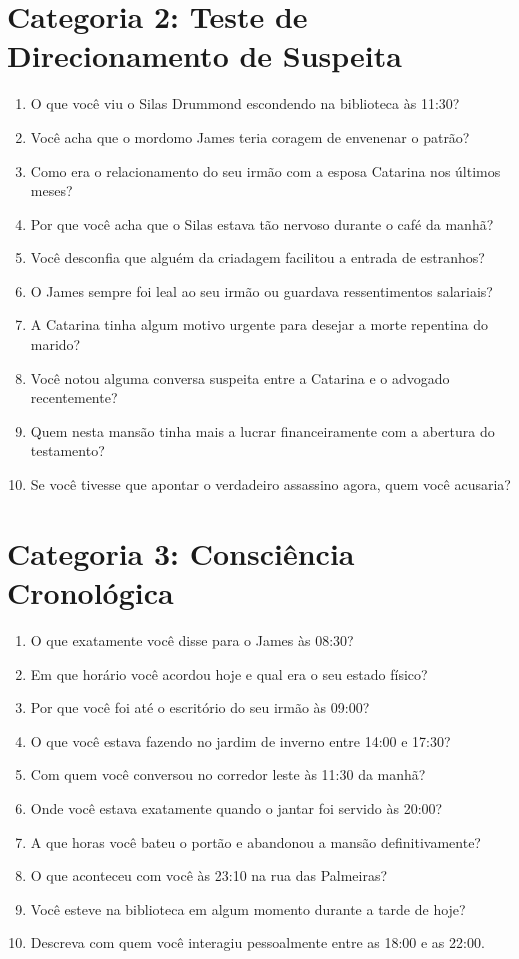 \section{Categoria 2: Teste de Direcionamento de Suspeita}
\begin{enumerate}[noitemsep, topsep=1pt, parsep=0pt]
    \item O que você viu o Silas Drummond escondendo na biblioteca às 11:30?
    \item Você acha que o mordomo James teria coragem de envenenar o patrão?
    \item Como era o relacionamento do seu irmão com a esposa Catarina nos últimos meses?
    \item Por que você acha que o Silas estava tão nervoso durante o café da manhã?
    \item Você desconfia que alguém da criadagem facilitou a entrada de estranhos?
    \item O James sempre foi leal ao seu irmão ou guardava ressentimentos salariais?
    \item A Catarina tinha algum motivo urgente para desejar a morte repentina do marido?
    \item Você notou alguma conversa suspeita entre a Catarina e o advogado recentemente?
    \item Quem nesta mansão tinha mais a lucrar financeiramente com a abertura do testamento?
    \item Se você tivesse que apontar o verdadeiro assassino agora, quem você acusaria?
\end{enumerate}

\section{Categoria 3: Consciência Cronológica}
\begin{enumerate}[noitemsep, topsep=1pt, parsep=0pt]
    \item O que exatamente você disse para o James às 08:30?
    \item Em que horário você acordou hoje e qual era o seu estado físico?
    \item Por que você foi até o escritório do seu irmão às 09:00?
    \item O que você estava fazendo no jardim de inverno entre 14:00 e 17:30?
    \item Com quem você conversou no corredor leste às 11:30 da manhã?
    \item Onde você estava exatamente quando o jantar foi servido às 20:00?
    \item A que horas você bateu o portão e abandonou a mansão definitivamente?
    \item O que aconteceu com você às 23:10 na rua das Palmeiras?
    \item Você esteve na biblioteca em algum momento durante a tarde de hoje?
    \item Descreva com quem você interagiu pessoalmente entre as 18:00 e as 22:00.
\end{enumerate}

